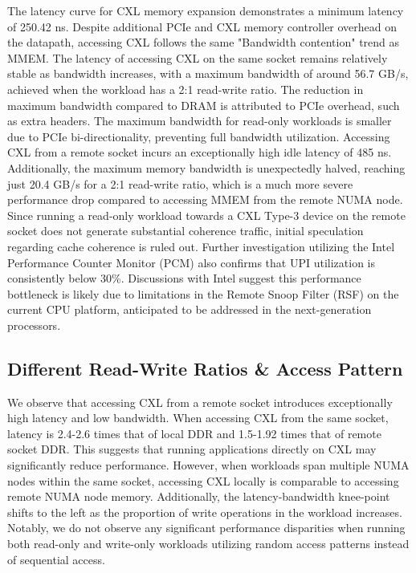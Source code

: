 The latency curve for CXL memory expansion demonstrates a minimum latency of 250.42 ns. Despite additional PCIe and CXL memory controller overhead on the datapath, accessing CXL follows the same "Bandwidth contention" trend as MMEM. The latency of accessing CXL on the same socket remains relatively stable as bandwidth increases, with a maximum bandwidth of around 56.7 GB/s, achieved when the workload has a 2:1 read-write ratio. The reduction in maximum bandwidth compared to DRAM is attributed to PCIe overhead, such as extra headers. The maximum bandwidth for read-only workloads is smaller due to PCIe bi-directionality, preventing full bandwidth utilization. Accessing CXL from a remote socket incurs an exceptionally high idle latency of 485 ns. Additionally, the maximum memory bandwidth is unexpectedly halved, reaching just 20.4 GB/s for a 2:1 read-write ratio, which is a much more severe performance drop compared to accessing MMEM from the remote NUMA node. Since running a read-only workload towards a CXL Type-3 device on the remote socket does not generate substantial coherence traffic, initial speculation regarding cache coherence is ruled out. Further investigation utilizing the Intel Performance Counter Monitor (PCM) also confirms that UPI utilization is consistently below 30\%. Discussions with Intel suggest this performance bottleneck is likely due to limitations in the Remote Snoop Filter (RSF) on the current CPU platform, anticipated to be addressed in the next-generation processors.

\subsection{Different Read-Write Ratios \& Access Pattern}

We observe that accessing CXL from a remote socket introduces exceptionally high latency and low bandwidth. When accessing CXL from the same socket, latency is 2.4-2.6 times that of local DDR and 1.5-1.92 times that of remote socket DDR. This suggests that running applications directly on CXL may significantly reduce performance. However, when workloads span multiple NUMA nodes within the same socket, accessing CXL locally is comparable to accessing remote NUMA node memory. Additionally, the latency-bandwidth knee-point shifts to the left as the proportion of write operations in the workload increases. Notably, we do not observe any significant performance disparities when running both read-only and write-only workloads utilizing random access patterns instead of sequential access.

